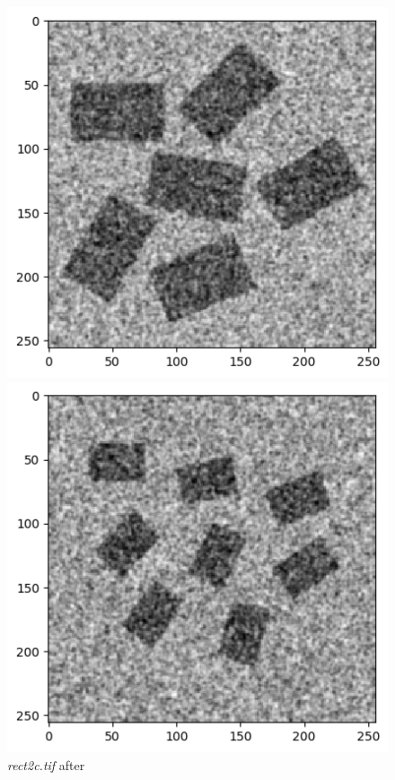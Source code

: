 \documentclass[runningheads]{llncs}
\begin{document}
\begin{figure}[h!]
\begin{minipage}[h]{0.47\linewidth}
\begin{center}
\includegraphics[width=1\linewidth]{Report/Result_Images/image_hc2.png} 
\caption{\emph{rect2c.tif} after}
\label{hc2-Gaussian and Kernel 1}
\end{center}
\end{minipage}
\vfill
\vspace{0.2 cm}
\begin{minipage}[h]{0.47\linewidth}
\begin{center}
\includegraphics[width=1\linewidth]{Report/Result_Images/image_hc3.png} 

\end{center}
\end{minipage}
\end{figure}
\end{document}
